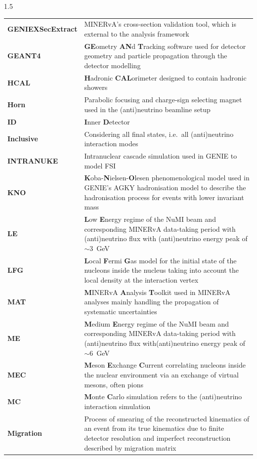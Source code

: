 \begin{spacing}{1.5}
\begin{longtable}[l]{p{} p{}}
        \textbf{GENIEXSecExtract} & MINERvA's cross-section validation tool, which is external to the analysis framework \\
        \textbf{GEANT4} & \textbf{GE}ometry \textbf{AN}d \textbf{T}racking software used for detector geometry and particle propagation through the detector modelling \\
        \textbf{HCAL} & \textbf{H}adronic \textbf{CAL}orimeter designed to contain hadronic showers   \\
        \textbf{Horn} & Parabolic focusing and charge-sign selecting magnet used in the (anti)neutrino beamline setup \\
        \textbf{ID} & \textbf{I}nner \textbf{D}etector  \\
        \textbf{Inclusive} & Considering all final states, i.e.~all (anti)neutrino interaction modes \\
        \textbf{INTRANUKE} & Intranuclear cascade simulation used in GENIE to model FSI  \\
        \textbf{KNO} & \textbf{K}oba-\textbf{N}ielsen-\textbf{O}lesen phenomenological model used in GENIE's AGKY hadronisation model to describe the hadronisation process for events with lower invariant mass \\
        \textbf{LE} & \textbf{L}ow \textbf{E}nergy regime of the NuMI beam and corresponding MINERvA data-taking period with (anti)neutrino flux with (anti)neutrino energy peak of $\sim$3~GeV  \\
        \textbf{LFG} & \textbf{L}ocal \textbf{F}ermi \textbf{G}as model for the initial state of the nucleons inside the nucleus taking into account the local density at the interaction vertex \\
        \textbf{MAT} & \textbf{M}INERvA \textbf{A}nalysis \textbf{T}oolkit used in MINERvA analyses mainly handling the propagation of systematic uncertainties \\
        \textbf{ME} & \textbf{M}edium \textbf{E}nergy regime of the NuMI beam and corresponding MINERvA data-taking period with (anti)neutrino flux with(anti)neutrino energy peak of $\sim$6~GeV\\
        \textbf{MEC} & \textbf{M}eson \textbf{E}xchange \textbf{C}urrent correlating nucleons inside the nuclear environment via an exchange of virtual mesons, often pions\\
        \textbf{MC} & \textbf{M}onte \textbf{C}arlo simulation refers to the (anti)neutrino interaction simulation  \\
        \textbf{Migration} & Process of smearing of the reconstructed kinematics of an event from its true kinematics due to finite detector resolution and imperfect reconstruction described by migration matrix  \\

\end{longtable}
\end{spacing}

